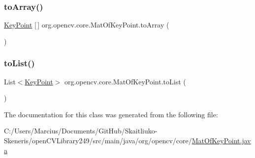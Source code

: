 \subsubsection{\texorpdfstring{to\+Array()}{toArray()}}
{\footnotesize\ttfamily \mbox{\hyperlink{classorg_1_1opencv_1_1features2d_1_1_key_point}{Key\+Point}} \mbox{[}$\,$\mbox{]} org.\+opencv.\+core.\+Mat\+Of\+Key\+Point.\+to\+Array (\begin{DoxyParamCaption}{ }\end{DoxyParamCaption})}

\mbox{\label{classorg_1_1opencv_1_1core_1_1_mat_of_key_point_a596df9e23a120ed116b8249971509012}} 
\subsubsection{\texorpdfstring{to\+List()}{toList()}}
{\footnotesize\ttfamily List$<$\mbox{\hyperlink{classorg_1_1opencv_1_1features2d_1_1_key_point}{Key\+Point}}$>$ org.\+opencv.\+core.\+Mat\+Of\+Key\+Point.\+to\+List (\begin{DoxyParamCaption}{ }\end{DoxyParamCaption})}



The documentation for this class was generated from the following file\+:\begin{DoxyCompactItemize}
\item 
C\+:/\+Users/\+Marcius/\+Documents/\+Git\+Hub/\+Skaitliuko-\/\+Skeneris/open\+C\+V\+Library249/src/main/java/org/opencv/core/\mbox{\hyperlink{_mat_of_key_point_8java}{Mat\+Of\+Key\+Point.\+java}}\end{DoxyCompactItemize}
